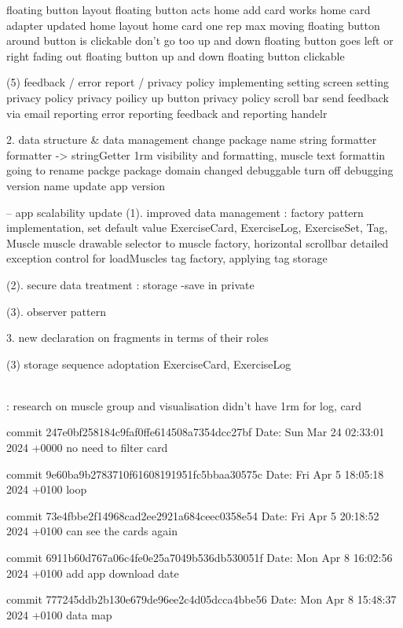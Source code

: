floating button layout 
floating button acts
home add card works
home card adapter updated
home layout
home card one rep max
moving floating button around
button is clickable
don't go too up and down
floating button goes left or right
fading out
floating button up and down
floating button clickable



(5) feedback / error report / privacy policy
implementing setting screen
setting privacy policy
privacy poilicy up button
privacy policy scroll bar
send feedback via email
reporting
error reporting
feedback and reporting handelr


2. data structure & data management 
change package name
string formatter
formatter -> stringGetter
1rm visibility and formatting, muscle text formattin
going to rename packge
package domain changed
debuggable
turn off debugging
version name update
app version

-- app scalability update
(1). improved data management : factory pattern implementation, set default value 
    ExerciseCard, ExerciseLog, ExerciseSet, Tag, Muscle
    muscle drawable selector to muscle factory, horizontal scrollbar
detailed exception control for loadMuscles
    tag factory, applying tag storage

(2). secure data treatment : storage -save in private

(3). observer pattern 


3. new declaration on fragments in terms of their roles

(3) storage sequence adoptation 
    ExerciseCard, ExerciseLog






\\ : 
research on muscle group and visualisation
didn't have 1rm for log, card


commit 247e0bf258184c9faf0ffe614508a7354dcc27bf
Date:   Sun Mar 24 02:33:01 2024 +0000
    no need to filter card

commit 9e60ba9b2783710f61608191951fc5bbaa30575c
Date:   Fri Apr 5 18:05:18 2024 +0100
    loop

commit 73e4fbbe2f14968cad2ee2921a684ceec0358e54
Date:   Fri Apr 5 20:18:52 2024 +0100
    can see the cards again

commit 6911b60d767a06c4fe0e25a7049b536db530051f
Date:   Mon Apr 8 16:02:56 2024 +0100
    add app download date

commit 777245ddb2b130e679de96ee2c4d05dcca4bbe56
Date:   Mon Apr 8 15:48:37 2024 +0100
    data map

